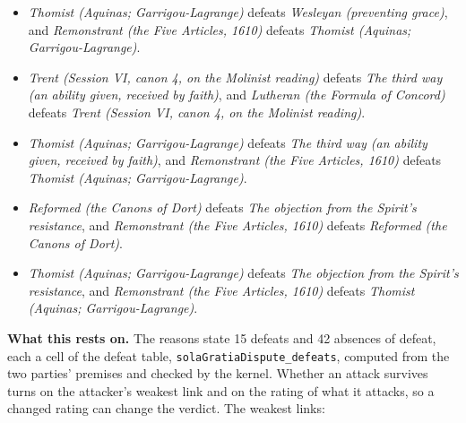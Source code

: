 \documentclass[11pt]{article}
\begin{document}
\begin{itemize}
\begin{itemize}
\item \emph{Thomist (Aquinas; Garrigou-Lagrange)} defeats \emph{Wesleyan (preventing grace)}, and \emph{Remonstrant (the Five Articles, 1610)} defeats \emph{Thomist (Aquinas; Garrigou-Lagrange)}.
\item \emph{Trent (Session VI, canon 4, on the Molinist reading)} defeats \emph{The third way (an ability given, received by faith)}, and \emph{Lutheran (the Formula of Concord)} defeats \emph{Trent (Session VI, canon 4, on the Molinist reading)}.
\item \emph{Thomist (Aquinas; Garrigou-Lagrange)} defeats \emph{The third way (an ability given, received by faith)}, and \emph{Remonstrant (the Five Articles, 1610)} defeats \emph{Thomist (Aquinas; Garrigou-Lagrange)}.
\item \emph{Reformed (the Canons of Dort)} defeats \emph{The objection from the Spirit’s resistance}, and \emph{Remonstrant (the Five Articles, 1610)} defeats \emph{Reformed (the Canons of Dort)}.
\item \emph{Thomist (Aquinas; Garrigou-Lagrange)} defeats \emph{The objection from the Spirit’s resistance}, and \emph{Remonstrant (the Five Articles, 1610)} defeats \emph{Thomist (Aquinas; Garrigou-Lagrange)}.
\end{itemize}
\end{itemize}
\par\noindent\textbf{What this rests on.} The reasons state 15 defeats and 42 absences of defeat, each a cell of the defeat table, \texttt{sola\allowbreak{}Gratia\allowbreak{}Dispute\_\allowbreak{}defeats}, computed from the two parties' premises and checked by the kernel. Whether an attack survives turns on the attacker's weakest link and on the rating of what it attacks, so a changed rating can change the verdict. The weakest links:
\end{document}
